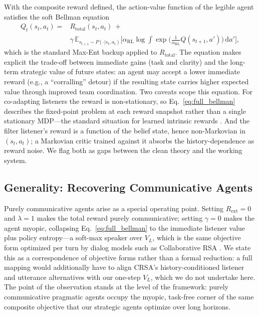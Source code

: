 \documentclass{article}
\newcommand{\Rext}{R_{\text{ext}}}
\newcommand{\Rtotal}{R_{\text{total}}}
\newcommand{\VL}{V_L}
\newcommand{\AlphaRL}{\alpha_{\text{RL}}}
\begin{document}
With the composite reward defined, the action-value function of the legible agent satisfies the soft Bellman equation
\begin{equation}
\label{eq:full_bellman}
\begin{split}
    Q_t(s_t, a_t) ={}& \Rtotal(s_t, a_t) \,+ \\
                     & \gamma\, \mathbb{E}_{s_{t+1}\sim P(\cdot|s_t,a_t)}\Big[\AlphaRL \log \!\int \exp\big(\tfrac{1}{\AlphaRL}Q(s_{t+1}, a')\big)\, \mathrm{d}a'\Big],
\end{split}
\end{equation}
which is the standard Max-Ent backup applied to $\Rtotal$. The equation makes explicit the trade-off between immediate gains (task and clarity) and the long-term strategic value of future states: an agent may accept a lower immediate reward (e.g., a ``corralling'' detour) if the resulting state carries higher expected value through improved team coordination. Two caveats scope this equation. For co-adapting listeners the reward is non-stationary, so Eq.~\ref{eq:full_bellman} describes the fixed-point problem at each reward snapshot rather than a single stationary MDP---the standard situation for learned intrinsic rewards \cite{eysenbach2019diversity}. And the filter listener's reward is a function of the belief state, hence non-Markovian in $(s_t,a_t)$; a Markovian critic trained against it absorbs the history-dependence as reward noise. We flag both as gaps between the clean theory and the working system.

\subsection{Generality: Recovering Communicative Agents}
\label{ssec:recover_crsa}

Purely communicative agents arise as a special operating point. Setting $\Rext=0$ and $\lambda=1$ makes the total reward purely communicative; setting $\gamma=0$ makes the agent myopic, collapsing Eq.~\ref{eq:full_bellman} to the immediate listener value plus policy entropy---a soft-max speaker over $\VL$, which is the same objective form optimized per turn by dialog models such as Collaborative RSA \cite{estienne2025collaborative}. We state this as a correspondence of objective forms rather than a formal reduction: a full mapping would additionally have to align CRSA's history-conditioned listener and utterance alternatives with our one-step $\VL$, which we do not undertake here. The point of the observation stands at the level of the framework: purely communicative pragmatic agents occupy the myopic, task-free corner of the same composite objective that our strategic agents optimize over long horizons.
\end{document}
